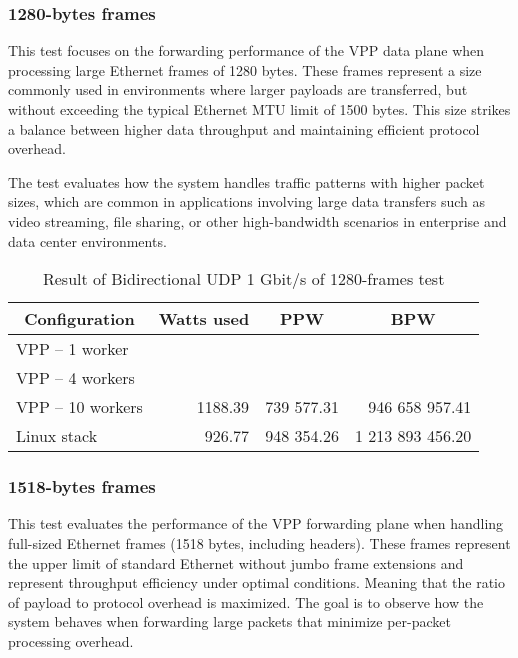 \subsubsection{1280-bytes frames}
This test focuses on the forwarding performance of the VPP data plane when processing large Ethernet frames of 1280 bytes. 
These frames represent a size commonly used in environments where larger payloads are transferred, but without exceeding the typical Ethernet MTU limit of 1500 bytes. 
This size strikes a balance between higher data throughput and maintaining efficient protocol overhead.

The test evaluates how the system handles traffic patterns with higher packet sizes, which are common in applications involving large data transfers such as video streaming, 
file sharing, or other high-bandwidth scenarios in enterprise and data center environments.

\begin{table}[h!]
\centering
\begin{tabular}{|l|r|r|r|}
\hline
\multicolumn{1}{|c|}{\textbf{Configuration}} &
\multicolumn{1}{c|}{\textbf{Watts used}} &
\multicolumn{1}{c|}{\textbf{PPW}} &
\multicolumn{1}{c|}{\textbf{BPW}} \\
\hline
VPP -- 1 worker &  &  &  \\
VPP -- 4 workers &  &  &  \\
VPP -- 10 workers & 1188.39 & 739 577.31 & 946 658 957.41 \\
Linux stack & 926.77 & 948 354.26 & 1 213 893 456.20 \\
\hline
\end{tabular}
\caption{Result of Bidirectional UDP 1 Gbit/s of 1280-frames test}
\label{tab:udp:five}
\end{table}



\subsubsection{1518-bytes frames}
This test evaluates the performance of the VPP forwarding plane when handling full-sized Ethernet frames (1518 bytes, including headers). 
These frames represent the upper limit of standard Ethernet without jumbo frame extensions and represent throughput efficiency under optimal conditions. 
Meaning that the ratio of payload to protocol overhead is maximized. The goal is to observe how the system behaves when forwarding large packets that minimize per-packet processing overhead.

